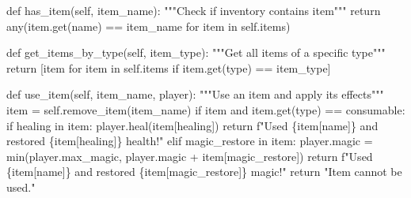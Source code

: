 \documentclass[
  letterpaper,
  DIV=11,
  numbers=noendperiod,
  oneside]{scrreprt}
\newenvironment{Shaded}{}{}
\newcommand{\BuiltInTok}[1]{\textcolor[rgb]{0.84,0.23,0.29}{#1}}
\newcommand{\CommentTok}[1]{\textcolor[rgb]{0.42,0.45,0.49}{#1}}
\newcommand{\ControlFlowTok}[1]{\textcolor[rgb]{0.84,0.23,0.29}{#1}}
\newcommand{\KeywordTok}[1]{\textcolor[rgb]{0.84,0.23,0.29}{#1}}
\newcommand{\NormalTok}[1]{\textcolor[rgb]{0.14,0.16,0.18}{#1}}
\newcommand{\OperatorTok}[1]{\textcolor[rgb]{0.14,0.16,0.18}{#1}}
\newcommand{\SpecialCharTok}[1]{\textcolor[rgb]{0.00,0.36,0.77}{#1}}
\newcommand{\SpecialStringTok}[1]{\textcolor[rgb]{0.01,0.18,0.38}{#1}}
\newcommand{\StringTok}[1]{\textcolor[rgb]{0.01,0.18,0.38}{#1}}
\newcommand{\VariableTok}[1]{\textcolor[rgb]{0.89,0.38,0.04}{#1}}
\begin{document}
\begin{Shaded}
\begin{Highlighting}[]
    \KeywordTok{def}\NormalTok{ has\_item(}\VariableTok{self}\NormalTok{, item\_name):}
        \CommentTok{"""Check if inventory contains item"""}
        \ControlFlowTok{return} \BuiltInTok{any}\NormalTok{(item.get(}\StringTok{\textquotesingle{}name\textquotesingle{}}\NormalTok{) }\OperatorTok{==}\NormalTok{ item\_name }\ControlFlowTok{for}\NormalTok{ item }\KeywordTok{in} \VariableTok{self}\NormalTok{.items)}
    
    \KeywordTok{def}\NormalTok{ get\_items\_by\_type(}\VariableTok{self}\NormalTok{, item\_type):}
        \CommentTok{"""Get all items of a specific type"""}
        \ControlFlowTok{return}\NormalTok{ [item }\ControlFlowTok{for}\NormalTok{ item }\KeywordTok{in} \VariableTok{self}\NormalTok{.items }\ControlFlowTok{if}\NormalTok{ item.get(}\StringTok{\textquotesingle{}type\textquotesingle{}}\NormalTok{) }\OperatorTok{==}\NormalTok{ item\_type]}
    
    \KeywordTok{def}\NormalTok{ use\_item(}\VariableTok{self}\NormalTok{, item\_name, player):}
        \CommentTok{"""Use an item and apply its effects"""}
\NormalTok{        item }\OperatorTok{=} \VariableTok{self}\NormalTok{.remove\_item(item\_name)}
        \ControlFlowTok{if}\NormalTok{ item }\KeywordTok{and}\NormalTok{ item.get(}\StringTok{\textquotesingle{}type\textquotesingle{}}\NormalTok{) }\OperatorTok{==} \StringTok{\textquotesingle{}consumable\textquotesingle{}}\NormalTok{:}
            \ControlFlowTok{if} \StringTok{\textquotesingle{}healing\textquotesingle{}} \KeywordTok{in}\NormalTok{ item:}
\NormalTok{                player.heal(item[}\StringTok{\textquotesingle{}healing\textquotesingle{}}\NormalTok{])}
                \ControlFlowTok{return} \SpecialStringTok{f"Used }\SpecialCharTok{\{}\NormalTok{item[}\StringTok{\textquotesingle{}name\textquotesingle{}}\NormalTok{]}\SpecialCharTok{\}}\SpecialStringTok{ and restored }\SpecialCharTok{\{}\NormalTok{item[}\StringTok{\textquotesingle{}healing\textquotesingle{}}\NormalTok{]}\SpecialCharTok{\}}\SpecialStringTok{ health!"}
            \ControlFlowTok{elif} \StringTok{\textquotesingle{}magic\_restore\textquotesingle{}} \KeywordTok{in}\NormalTok{ item:}
\NormalTok{                player.magic }\OperatorTok{=} \BuiltInTok{min}\NormalTok{(player.max\_magic, player.magic }\OperatorTok{+}\NormalTok{ item[}\StringTok{\textquotesingle{}magic\_restore\textquotesingle{}}\NormalTok{])}
                \ControlFlowTok{return} \SpecialStringTok{f"Used }\SpecialCharTok{\{}\NormalTok{item[}\StringTok{\textquotesingle{}name\textquotesingle{}}\NormalTok{]}\SpecialCharTok{\}}\SpecialStringTok{ and restored }\SpecialCharTok{\{}\NormalTok{item[}\StringTok{\textquotesingle{}magic\_restore\textquotesingle{}}\NormalTok{]}\SpecialCharTok{\}}\SpecialStringTok{ magic!"}
        \ControlFlowTok{return} \StringTok{"Item cannot be used."}
\end{Highlighting}
\end{Shaded}
\end{document}
